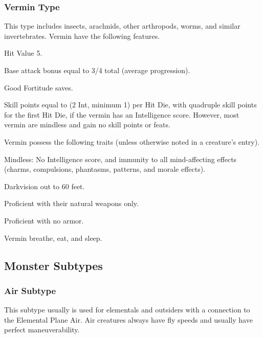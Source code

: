 \subsubsection{Vermin Type} This type includes insects, arachnids, other arthropods, worms, and similar invertebrates.
 Vermin have the following features.
\begin{itemize*}
\item Hit Value 5.
\item Base attack bonus equal to 3/4 total  (average progression).
\item Good Fortitude saves.
\item Skill points equal to (2 \add Int, minimum 1) per Hit Die, with quadruple skill points for the first Hit Die, if the vermin has an Intelligence score. However, most vermin are mindless and gain no skill points or feats.
\end{itemize*}
 Vermin possess the following traits (unless otherwise noted in a creature's entry).
\begin{itemize*}
\item Mindless: No Intelligence score, and immunity to all mind-affecting effects (charms, compulsions, phantasms, patterns, and morale effects).
\item Darkvision out to 60 feet.
\item Proficient with their natural weapons only.
\item Proficient with no armor.
\item Vermin breathe, eat, and sleep.
\end{itemize*}

\subsection{Monster Subtypes}

\subsubsection{Air Subtype} This subtype usually is used for elementals and outsiders with a connection to the Elemental Plane Air. Air creatures always have fly speeds and usually have perfect maneuverability.

